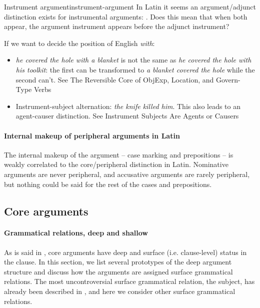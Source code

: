 \documentclass[a4paper, oneside, 12pt]{report}
\newcommand*{\citepage}[1]{p.~{#1}}
\newcommand*{\citepages}[1]{pp.~{#1}}
\newcommand{\form}[1]{\emph{#1}}
\begin{document}
\begin{todobox}{Instrument argument}{instrument-argument}
    In Latin it seems an argument/adjunct distinction exists for instrumental arguments:
    \citep[\citepages{57-58}, \citepage{65-67}]{devine2006latin}.
    Does this mean that when both appear, the argument instrument appears before the adjunct instrument?

    If we want to decide the position of English \form{with}:
    \begin{itemize}
        \item \form{he covered the hole with a blanket} is not the same as \form{he covered the hole with his toolkit}:
        the first can be transformed to \form{a blanket covered the hole}
        while the second can't.
        See The Reversible Core of ObjExp, Location, and Govern-Type Verbs
        \item Instrument-subject alternation: \form{the knife killed him}.
        This also leads to an agent-causer distinction.
        See Instrument Subjects Are Agents or Causers
        
        
    \end{itemize}
\end{todobox}

\paragraph*{Internal makeup of peripheral arguments in Latin}
The internal makeup of the argument -- case marking and prepositions --
is weakly correlated to the core/peripheral distinction in Latin.
Nominative arguments are never peripheral,
and accusative arguments are rarely peripheral,
but nothing could be said for the rest of the cases and prepositions.

\subsection{Core arguments}\label{sec:grammatical.clause.core}

\paragraph*{Grammatical relations, deep and shallow}

As is said in ,
core arguments have deep and surface (i.e. clause-level) status in the clause.
In this section, we list several prototypes of the deep argument structure
and discuss how the arguments are assigned surface grammatical relations.
The most uncontroversial surface grammatical relation,
the subject, has already been described in ,
and here we consider other surface grammatical relations. 
\end{document}
